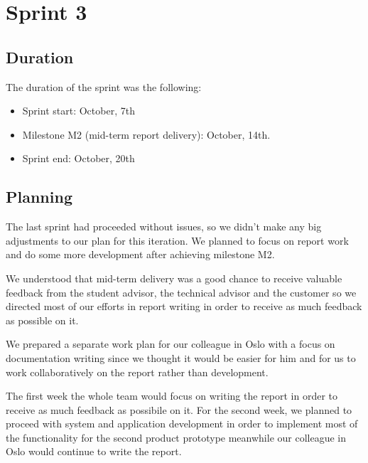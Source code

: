 
\chapter{Sprint 3}
\label{Sprint3}

\section{Duration}
The duration of the sprint was the following:
\begin{itemize}
\item Sprint start:  October, 7th
\item Milestone M2 (mid-term report delivery): October, 14th.
\item Sprint end: October, 20th
\end{itemize}

\section{Planning}

The last sprint had proceeded without issues, so we didn't make any big adjustments to our plan for this iteration. 
We planned to focus on report work and do some more development after achieving milestone M2.

We understood that mid-term delivery was a good chance to receive valuable feedback from the student advisor, the technical advisor and the customer so we directed most of our efforts in report writing in order to receive as much feedback as possible on it.

We prepared a separate work plan for our colleague in Oslo with a focus on documentation
writing since we thought it would be easier for him and for us to work collaboratively
on the report rather than development.

\iffalse
The first week the whole team would focus on writing the report
in order to receive as much feedback as possibile on it. 
For the second week, %
we planned to proceed with system and application development %
in order to implement most of the functionality for the second product prototype meanwhile
our colleague in Oslo would continue to write the report.

